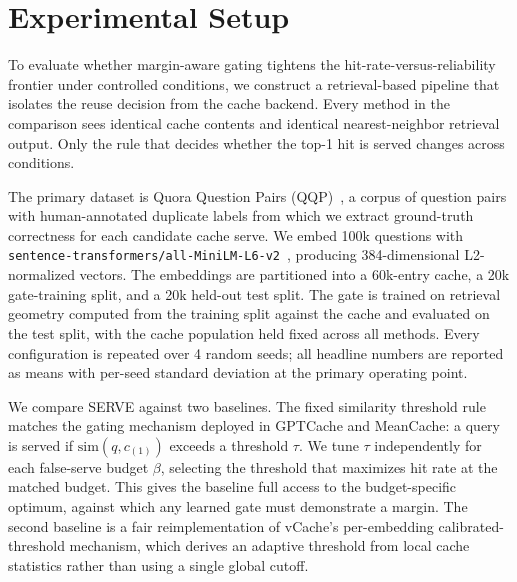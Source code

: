 \section{Experimental Setup}

To evaluate whether margin-aware gating tightens the hit-rate-versus-reliability frontier under controlled conditions, we construct a retrieval-based pipeline that isolates the reuse decision from the cache backend. Every method in the comparison sees identical cache contents and identical nearest-neighbor retrieval output. Only the rule that decides whether the top-1 hit is served changes across conditions.

The primary dataset is Quora Question Pairs (QQP)~\cite{quora2017qqp}, a corpus of question pairs with human-annotated duplicate labels from which we extract ground-truth correctness for each candidate cache serve. We embed 100k questions with \texttt{sentence-transformers/all-MiniLM-L6-v2}~\cite{wang2020minilm,reimers2019sentencebert}, producing 384-dimensional L2-normalized vectors.
The embeddings are partitioned into a 60k-entry cache, a 20k gate-training split, and a 20k held-out test split.
The gate is trained on retrieval geometry computed from the training split against the cache and evaluated on the test split, with the cache population held fixed across all methods. Every configuration is repeated over 4 random seeds; all headline numbers are reported as means with per-seed standard deviation at the primary operating point.

We compare SERVE against two baselines. The fixed similarity threshold rule matches the gating mechanism deployed in GPTCache and MeanCache: a query is served if $\mathrm{sim}(q, c_{(1)})$ exceeds a threshold $\tau$. We tune $\tau$ independently for each false-serve budget $\beta$, selecting the threshold that maximizes hit rate at the matched budget. This gives the baseline full access to the budget-specific optimum, against which any learned gate must demonstrate a margin. The second baseline is a fair reimplementation of vCache's per-embedding calibrated-threshold mechanism, which derives an adaptive threshold from local cache statistics rather than using a single global cutoff.

